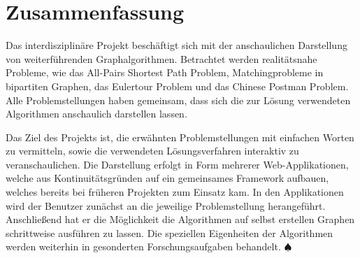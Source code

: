 \cleardoublepage



\section*{Zusammenfassung}
Das interdisziplinäre Projekt beschäftigt sich mit der anschaulichen Darstellung von weiterführenden Graphalgorithmen. Betrachtet werden realitätsnahe Probleme, wie das All-Pairs Shortest Path Problem, Matchingprobleme in bipartiten Graphen, das Eulertour Problem und das Chinese Postman Problem. Alle Problemstellungen haben gemeinsam, dass sich die zur Lösung verwendeten Algorithmen anschaulich darstellen lassen.

Das Ziel des Projekts ist, die erwähnten Problemstellungen mit einfachen Worten zu vermitteln, sowie die verwendeten Lösungsverfahren interaktiv zu veranschaulichen. Die Darstellung erfolgt in Form mehrerer Web-Applikationen, welche aus Kontinuitätsgründen auf ein gemeinsames Framework aufbauen, welches bereits bei früheren Projekten zum Einsatz kam. In den Applikationen wird der Benutzer zunächst an die jeweilige Problemstellung herangeführt. Anschließend hat er die Möglichkeit die Algorithmen auf selbst erstellen Graphen schrittweise ausführen zu lassen. Die speziellen Eigenheiten der Algorithmen werden weiterhin in gesonderten Forschungsaufgaben behandelt. \hfill$\spadesuit$
